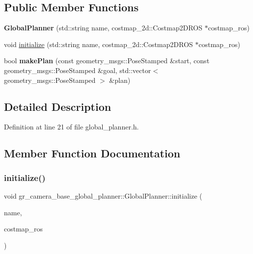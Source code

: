 \subsection*{Public Member Functions}
\begin{DoxyCompactItemize}
\item 
\mbox{\label{classgr__camera__base__global__planner_1_1GlobalPlanner_af9c3b606d62a2929f7adb00c319bf5ce}} 
{\bfseries Global\+Planner} (std\+::string name, costmap\+\_\+2d\+::\+Costmap2\+D\+R\+OS $\ast$costmap\+\_\+ros)
\item 
void \hyperlink{classgr__camera__base__global__planner_1_1GlobalPlanner_a73f1fcbc761007de417426be022642e9}{initialize} (std\+::string name, costmap\+\_\+2d\+::\+Costmap2\+D\+R\+OS $\ast$costmap\+\_\+ros)
\item 
\mbox{\label{classgr__camera__base__global__planner_1_1GlobalPlanner_a50a48ecf11b746a10cbd6a76ff4e263f}} 
bool {\bfseries make\+Plan} (const geometry\+\_\+msgs\+::\+Pose\+Stamped \&start, const geometry\+\_\+msgs\+::\+Pose\+Stamped \&goal, std\+::vector$<$ geometry\+\_\+msgs\+::\+Pose\+Stamped $>$ \&plan)
\end{DoxyCompactItemize}


\subsection{Detailed Description}


Definition at line 21 of file global\+\_\+planner.\+h.



\subsection{Member Function Documentation}
\mbox{\label{classgr__camera__base__global__planner_1_1GlobalPlanner_a73f1fcbc761007de417426be022642e9}} 
\subsubsection{\texorpdfstring{initialize()}{initialize()}}
{\footnotesize\ttfamily void gr\+\_\+camera\+\_\+base\+\_\+global\+\_\+planner\+::\+Global\+Planner\+::initialize (\begin{DoxyParamCaption}\item[{std\+::string}]{name,  }\item[{costmap\+\_\+2d\+::\+Costmap2\+D\+R\+OS $\ast$}]{costmap\+\_\+ros }\end{DoxyParamCaption})}

